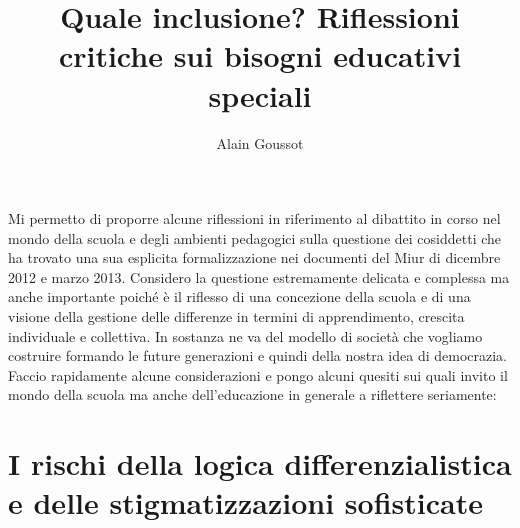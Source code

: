 \author{Alain Goussot}
\title{Quale inclusione? Riflessioni critiche sui bisogni educativi speciali}
\label{Goussot190713}
 \maketitle
 Mi permetto di proporre alcune riflessioni in riferimento al dibattito in corso nel mondo della scuola e degli ambienti pedagogici sulla questione dei cosiddetti  che ha trovato una sua esplicita formalizzazione nei documenti del Miur di dicembre 2012 e marzo 2013. Considero la questione estremamente delicata e complessa ma anche importante poiché è il riflesso di una concezione della scuola e di una visione della gestione delle differenze in termini di apprendimento, crescita individuale e collettiva. In sostanza ne va del modello di società che vogliamo costruire formando le future generazioni e quindi della nostra idea di democrazia. Faccio rapidamente alcune considerazioni e pongo alcuni quesiti sui quali invito il mondo della scuola ma anche dell'educazione in generale a riflettere seriamente:
\section*{ I rischi della logica differenzialistica e delle stigmatizzazioni sofisticate}
 
